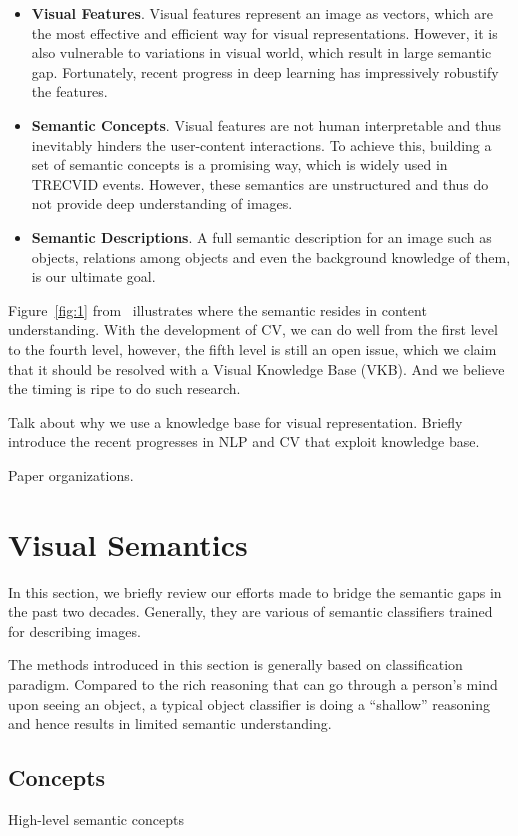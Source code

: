 \begin{itemize}[leftmargin=*]
	\item \textbf{Visual Features}. Visual features represent an image as vectors, which are the most effective and efficient way for visual representations. However, it is also vulnerable to variations in visual world, which result in large semantic gap. Fortunately, recent progress in deep learning has impressively robustify the features.
	\item \textbf{Semantic Concepts}. Visual features are not human interpretable and thus inevitably hinders the user-content interactions. To achieve this, building a set of semantic concepts is a promising way, which is widely used in TRECVID events. However, these semantics are unstructured and thus do not provide deep understanding of images. 
	\item \textbf{Semantic Descriptions}. A full semantic description for an image such as objects, relations among objects and even the background knowledge of them, is our ultimate goal.
\end{itemize}

Figure~\ref{fig:1} from~\cite{hare2006mind} illustrates where the semantic resides in content understanding. With the development of CV, we can do well from the first level to the fourth level, however, the fifth level is still an open issue, which we claim that it should be resolved with a Visual Knowledge Base (VKB). And we believe the timing is ripe to do such research.

Talk about why we use a knowledge base for visual representation. Briefly introduce the recent progresses in NLP and CV that exploit knowledge base.

Paper organizations.

\section{Visual Semantics}\label{sec:2}
In this section, we briefly review our efforts made to bridge the semantic gaps in the past two decades. Generally, they are various of semantic classifiers trained for describing images.

The methods introduced in this section is generally based on classification paradigm. Compared to the rich reasoning that can go through a person's mind upon seeing an object, a typical object classifier is doing a ``shallow'' reasoning and hence results in limited semantic understanding. 

\subsection{Concepts}
High-level semantic concepts
